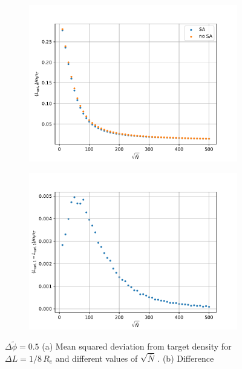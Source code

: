 \documentclass[bachelor,       %
               twoside,        %
               BCOR10mm,       %
               ngerman, english %
               ]{GAUBM}
\begin{document}
\begin{figure}[h]
  \centering
  \begin{subfigure}[b]{0.45\textwidth}
      \centering
      \includegraphics[width=\textwidth]{figures/opt_var_nbar_dphi0p25.pdf}
      \caption{}
      \label{fig:opt_var_nbar_dphi0p25}
  \end{subfigure}
    \hfill
  \begin{subfigure}[b]{0.45\textwidth}
      \centering
      \includegraphics[width=\textwidth]{figures/diff_var_nbar_dphi0p25.pdf}
      \caption{}
      \label{fig:diff_var_nbar_dphi0p25}
  \end{subfigure}
     \caption{$\Delta\tilde\phi=0.5 $ (a) Mean squared deviation from target density for $\Delta L=1/8\,R_e$ and different values of $\sqrt{\bar N}\,.$ (b) Difference}
     \label{fig:var_nbar_dphi0p25}
\end{figure}
\end{document}
